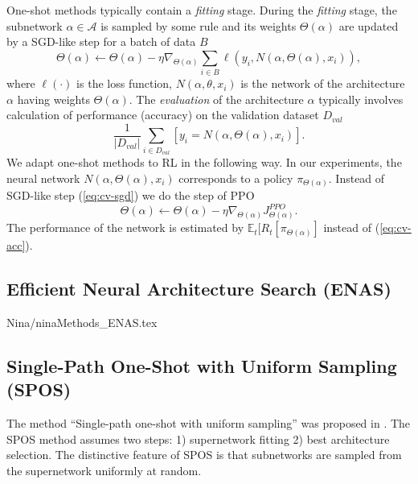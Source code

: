 \documentclass{svproc}
\begin{document}
One-shot methods typically contain a \textit{fitting} stage. During the \textit{fitting} stage, the subnetwork $\alpha \in \mathcal{A}$ is sampled by some rule and its weights $\Theta(\alpha)$ are updated by a SGD-like step for a batch of data $B$
\begin{equation}
\label{eq:cv-sgd}
\Theta(\alpha) \gets \Theta(\alpha) - \eta \nabla_{\Theta(\alpha)} \sum_{i\in B} \ell(y_i, N(\alpha, \Theta(\alpha), x_i)),
\end{equation}
where $\ell(\cdot)$ is the loss function, $N(\alpha, \theta, x_i)$ is the network of the architecture $\alpha$ having weights $\Theta(\alpha)$.
The \textit{evaluation} of the architecture $\alpha$ typically involves calculation of performance (accuracy) on the validation dataset $D_{val}$
\begin{equation}
\label{eq:cv-acc}
\frac{1}{|D_{val}|}\sum_{i \in D_{val}}[y_i = N(\alpha, \Theta(\alpha),x_i)].
\end{equation}
We adapt one-shot methods to RL in the following way. In our experiments, the neural network $N(\alpha, \Theta(\alpha), x_i)$ corresponds to a policy $\pi_{\Theta(\alpha)}$. Instead of SGD-like step (\ref{eq:cv-sgd}) we do the step of PPO 
\begin{equation}
\Theta(\alpha) \gets \Theta(\alpha) - \eta \nabla_{\Theta(\alpha)} J^{PPO}_{\Theta(\alpha)}.
\end{equation}
The performance of the network is estimated by 
$\mathbb{E}_{t} [ R_{t}[\pi_{\Theta(\alpha)}]$
instead of (\ref{eq:cv-acc}).

\subsection{Efficient Neural Architecture Search (ENAS)}
{Nina/ninaMethods_ENAS.tex}

\subsection{Single-Path One-Shot with Uniform Sampling (SPOS)}

The method ``Single-path one-shot with uniform sampling'' was proposed in \cite{guo2019single}.
The SPOS method assumes two steps: 1) supernetwork fitting 2) best architecture selection.
The distinctive feature of SPOS is that subnetworks are sampled from the supernetwork uniformly at random.
\end{document}
